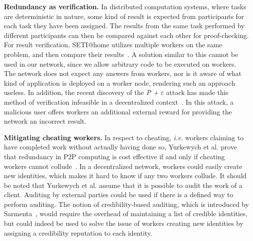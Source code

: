 \textbf{Redundancy as verification.} In distributed computation systems, where tasks are deterministic in nature, some kind of result is expected from participants for each task they have been assigned. The results from the same task performed by different participants can then be compared against each other for proof-checking. For result verification, SETI@home utilizes multiple workers on the same problem, and then compare their results~\cite{korpela:2001}. A solution similar to this cannot be used in our network, since we allow arbitrary code to be executed on workers. The network does not expect any answers from workers, nor is it aware of what kind of application is deployed on a worker node, rendering such an approach useless. In addition, the recent discovery of the \emph{P +} $\varepsilon$ attack has made this method of verification infeasible in a decentralized context~\cite{buterin:2015}. In this attack, a malicious user offers workers an additional external reward for providing the network an incorrect result.

\textbf{Mitigating cheating workers.}
In respect to cheating, \textit{i.e.} workers claiming to have completed work without actually having done so, Yurkewych et al. prove that redundancy in P2P computing is cost effective if and only if cheating workers cannot collude~\cite{yurkewych:2005}. In a decentralized network, workers could easily create new identities, which makes it hard to know if any two workers collude. It should be noted that Yurkewych et al. assume that it is possible to audit the work of a client. Auditing by external parties could be used if there is a defined way to perform auditing. The notion of credibility-based auditing, which is introduced by Sarmenta~\cite{sarmenta:2002}, would require the overhead of maintaining a list of credible identities, but could indeed be used to solve the issue of workers creating new identities by assigning a credibility reputation to each identity.

